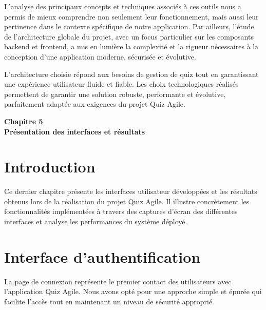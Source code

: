 \documentclass[12pt,a4paper]{report}
\begin{document}
L'analyse des principaux concepts et techniques associés à ces outils nous a permis de mieux comprendre non seulement leur fonctionnement, mais aussi leur pertinence dans le contexte spécifique de notre application. Par ailleurs, l'étude de l'architecture globale du projet, avec un focus particulier sur les composants backend et frontend, a mis en lumière la complexité et la rigueur nécessaires à la conception d'une application moderne, sécurisée et évolutive.

L'architecture choisie répond aux besoins de gestion de quiz tout en garantissant une expérience utilisateur fluide et fiable. Les choix technologiques réalisés permettent de garantir une solution robuste, performante et évolutive, parfaitement adaptée aux exigences du projet Quiz Agile.


\cleardoublepage
\thispagestyle{empty}
\begin{center}
    \vspace*{4cm}
    {\Huge \textbf{Chapitre 5}}\\[1.5cm]
    {\LARGE \textbf{Présentation des interfaces et résultats}}
\end{center}
\cleardoublepage

\setcounter{section}{0}

\section{Introduction}

Ce dernier chapitre présente les interfaces utilisateur développées et les résultats obtenus lors de la réalisation du projet Quiz Agile. Il illustre concrètement les fonctionnalités implémentées à travers des captures d'écran des différentes interfaces et analyse les performances du système déployé.

\section{Interface d'authentification}

La page de connexion représente le premier contact des utilisateurs avec l'application Quiz Agile. Nous avons opté pour une approche simple et épurée qui facilite l'accès tout en maintenant un niveau de sécurité approprié.
\end{document}
